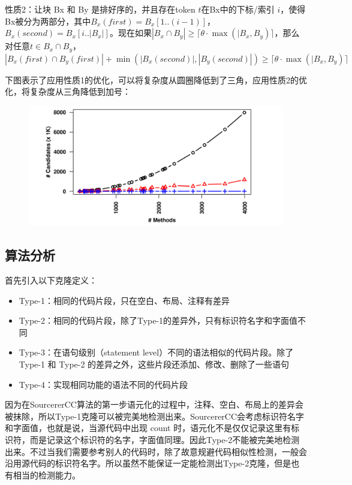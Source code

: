 \documentclass{cjc}
\begin{document}
性质2：让块 Bx 和 By 是排好序的，并且存在token $t$在Bx中的下标/索引 $i$，使得Bx被分为两部分，其中$B_x(first)=B_x[1..(i-1)]$，$B_x(second)=B_x[i..|B_x|]$。现在如果$|B_x\cap B_y|\geq \lceil\theta \cdot \max (|B_x, B_y)\rceil$，那么对任意$t\in B_x\cap B_y$，$|B_x(first)\cap B_y(first)|+\min(|B_x(second)|,|B_y(second)|)\ge \lceil\theta \cdot \max (|B_x, B_y)\rceil$

下图表示了应用性质1的优化，可以将复杂度从圆圈降低到了三角，应用性质2的优化，将复杂度从三角降低到加号：

\begin{figure}[htb]
  \centering
  \includegraphics[width=\linewidth]{pics/image-20220530082000846.png}
\end{figure}

\subsection{算法分析}

首先引入以下克隆定义：

\begin{itemize}
    \item Type-1：相同的代码片段，只在空白、布局、注释有差异
    \item Type-2：相同的代码片段，除了Type-1的差异外，只有标识符名字和字面值不同
    \item Type-3：在语句级别（statement level）不同的语法相似的代码片段。除了 Type-1 和 Type-2 的差异之外，这些片段还添加、修改、删除了一些语句
    \item Type-4：实现相同功能的语法不同的代码片段
\end{itemize}

因为在SourcererCC算法的第一步语元化的过程中，注释、空白、布局上的差异会被抹除，所以Type-1克隆可以被完美地检测出来。SourcererCC会考虑标识符名字和字面值，也就是说，当源代码中出现 count 时，语元化不是仅仅记录这里有标识符，而是记录这个标识符的名字，字面值同理。因此Type-2不能被完美地检测出来。不过当我们需要参考别人的代码时，除了故意规避代码相似性检测，一般会沿用源代码的标识符名字。所以虽然不能保证一定能检测出Type-2克隆，但是也有相当的检测能力。
\end{document}
